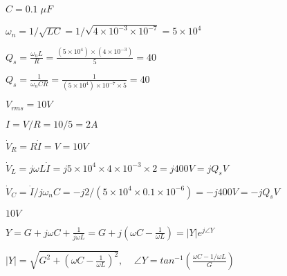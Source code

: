 \documentclass{article}
\def\lthtmlcheckvsize{\ifdim\ht\sizebox<\vsize 
  \ifdim\wd\sizebox<\hsize\expandafter\hfill\fi \expandafter\vfill
  \else\expandafter\vss\fi}%
\begin{document}
{\newpage\clearpage
{}%
$ C=0.1\;\mu F$%
\lthtmlindisplaymathZ
\lthtmlcheckvsize\clearpage}

{\newpage\clearpage
{}%
$ \omega_n=1/\sqrt{LC}=1/\sqrt{4\times 10^{-3}\times 10^{-7}}=5\times 10^4$%
\lthtmlindisplaymathZ
\lthtmlcheckvsize\clearpage}

{\newpage\clearpage
{}%
$\displaystyle Q_s=\frac{\omega_nL}{R}=\frac{(5\times 10^4)\times (4\times 10^{-3})}{5}
=40$%
\lthtmlindisplaymathZ
\lthtmlcheckvsize\clearpage}

{\newpage\clearpage
{}%
$\displaystyle Q_s=\frac{1}{\omega_nCR}=\frac{1}{(5\times 10^4)\times 10^{-7}\times 5}
=40$%
\lthtmlindisplaymathZ
\lthtmlcheckvsize\clearpage}

{\newpage\clearpage
{}%
$ V_{rms}=10V$%
\lthtmlindisplaymathZ
\lthtmlcheckvsize\clearpage}

{\newpage\clearpage
{}%
$ I=V/R=10/5=2 A$%
\lthtmlindisplaymathZ
\lthtmlcheckvsize\clearpage}

{\newpage\clearpage
{}%
$ \dot{V}_R=R\dot{I}=V=10V$%
\lthtmlindisplaymathZ
\lthtmlcheckvsize\clearpage}

{\newpage\clearpage
{}%
$ \dot{V}_L=j\omega L \dot{I}=j5\times 10^4\times 4\times 10^{-3} \times 2=j400V=jQ_sV$%
\lthtmlindisplaymathZ
\lthtmlcheckvsize\clearpage}

{\newpage\clearpage
{}%
$ \dot{V}_C=\dot{I}/j\omega_nC=-j2/(5\times 10^4\times 0.1\times 10^{-6})=-j400V=-jQ_sV$%
\lthtmlindisplaymathZ
\lthtmlcheckvsize\clearpage}

{\newpage\clearpage
{}%
$ 10V$%
\lthtmlindisplaymathZ
\lthtmlcheckvsize\clearpage}

{\newpage\clearpage
{}%
$\displaystyle Y=G+j\omega C+\frac{1}{j\omega L}=G+j\left(\omega C-\frac{1}{\omega L}\right)
=|Y|e^{j\angle Y}$%
\lthtmlindisplaymathZ
\lthtmlcheckvsize\clearpage}

{\newpage\clearpage
{}%
$\displaystyle |Y|=\sqrt{G^2+\left(\omega C-\frac{1}{\omega L}\right)^2},\;\;\;\;
\angle Y=tan^{-1} \left(\frac{\omega C-1/\omega L}{G}\right)$%
\lthtmlindisplaymathZ
\lthtmlcheckvsize\clearpage}
\end{document}
